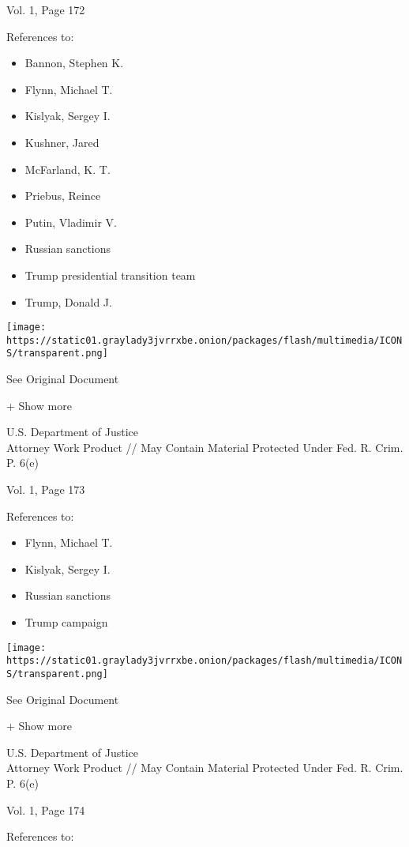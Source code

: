 Vol. 1, Page 172

References to:

\begin{itemize}
\tightlist
\item
  Bannon, Stephen K.
\item
  Flynn, Michael T.
\item
  Kislyak, Sergey I.
\item
  Kushner, Jared
\item
  McFarland, K. T.
\item
  Priebus, Reince
\item
  Putin, Vladimir V.
\item
  Russian sanctions
\item
  Trump presidential transition team
\item
  Trump, Donald J.
\end{itemize}

\protect\hyperlink{}{}

\texttt{[image: https://static01.graylady3jvrrxbe.onion/packages/flash/multimedia/ICONS/transparent.png]}

See Original Document

+ Show more

U.S. Department of Justice\\
Attorney Work Product // May Contain Material Protected Under Fed. R.
Crim. P. 6(e)

Vol. 1, Page 173

References to:

\begin{itemize}
\tightlist
\item
  Flynn, Michael T.
\item
  Kislyak, Sergey I.
\item
  Russian sanctions
\item
  Trump campaign
\end{itemize}

\protect\hyperlink{}{}

\texttt{[image: https://static01.graylady3jvrrxbe.onion/packages/flash/multimedia/ICONS/transparent.png]}

See Original Document

+ Show more

U.S. Department of Justice\\
Attorney Work Product // May Contain Material Protected Under Fed. R.
Crim. P. 6(e)

Vol. 1, Page 174

References to:

